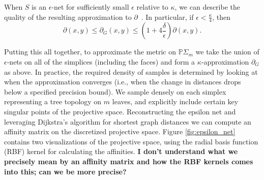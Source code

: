 \documentclass[a4paper,11pt]{article}
\begin{document}
When $S$ is an $\epsilon$-net for sufficiently small $\epsilon$ relative to $\kappa$, we can describe the quality of the resulting approximation to $\partial$~\cite[Thm. 2]{bernstein2000graph}.
In particular, if $\epsilon < \frac{\kappa}{4}$, then 
\[
\partial(x,y) \leq \partial_G(x,y) \leq (1 + 4\frac{\delta}{\epsilon}) \partial(x,y).
\]

Putting this all together, to approximate the metric on
$\mathbb{P}\Sigma_m$ we take the union of $\epsilon$-nets on all of
the simplices (including the faces) and form a $\kappa$-approximation
$\partial_G$ as above.  In practice, the required density of samples
is determined by looking at when the approximation converges (i.e.,
when the change in distances drops below a specified precision bound).
We sample densely on each simplex representing a tree topology on $m$
leaves, and explicitly include certain key singular points of the
projective space.  Reconstructing the epsilon net and leveraging
Dijkstra's algorithm for shortest graph distances we can compute an
affinity matrix on the discretized projective space.  Figure
\ref{fig:epsilon_net} contains two visualizations of the projective
space, using the radial basis function (RBF) kernel for calculating
the affinities.
{\bf I don't understand what we precisely mean by an affinity matrix
  and how the RBF kernels comes into this; can we be more precise?}
\end{document}
